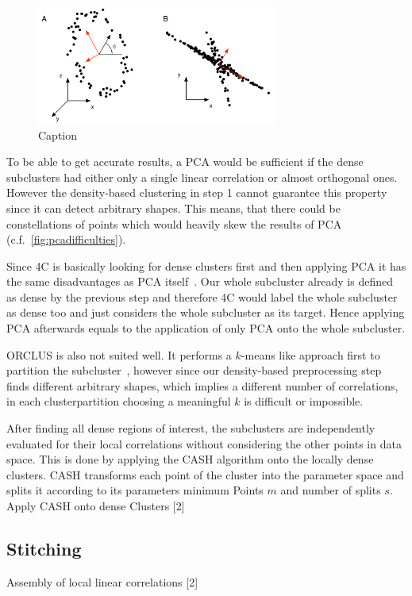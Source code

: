 \begin{figure}
    \centering
    \includegraphics[width=0.7\textwidth]{figures/PCAdifficulties.png}
    \caption{Caption}
    \label{fig:pcadifficulties}
\end{figure}

To be able to get accurate results, a \ac{PCA} would be sufficient if the dense subclusters had either only a single linear correlation or almost orthogonal ones. However the density-based clustering in step 1 cannot guarantee this property since it can detect arbitrary shapes. This means, that there could be constellations of points which would heavily skew the results of \ac{PCA} (c.f.~\autoref{fig:pcadifficulties})\cite{PCAshlens2014tutorial}. 

Since \ac{4C} is basically looking for dense clusters first and then applying \ac{PCA} it has the same disadvantages as \ac{PCA} itself~\cite{4cbohm2004computing}. Our whole subcluster already is defined as dense by the previous step and therefore \ac{4C} would label the whole subcluster as dense too and just considers the whole subcluster as its target. Hence applying \ac{PCA} afterwards equals to the application of only \ac{PCA} onto the whole subcluster. 

\ac{ORCLUS} is also not suited well. It performs a $k$-means like approach first to partition the subcluster~\cite{orclusaggarwal2000finding}, however since our density-based preprocessing step finds different arbitrary shapes, which implies a different number of correlations, in each clusterpartition choosing a meaningful $k$ is difficult or impossible. 




After finding all dense regions of interest, the subclusters are independently evaluated for their local correlations without considering the other points in data space. This is done by applying the \ac{CASH} algorithm onto the locally dense clusters. \ac{CASH} transforms each point of the cluster into the parameter space and splits it according to its parameters minimum Points $m$ and number of splits $s$. 
Apply CASH onto dense Clusters [2]

\subsection{Stitching}

Assembly of local linear correlations [2]